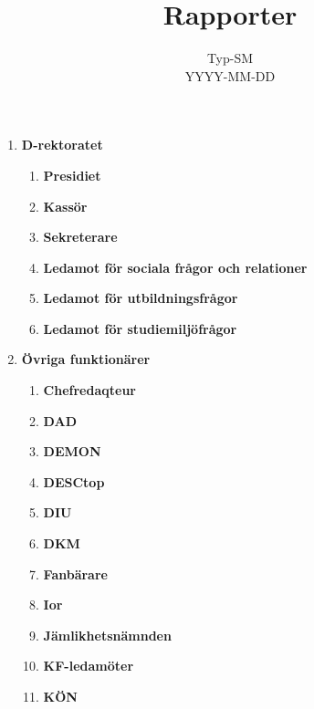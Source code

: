 \documentclass[a4paper]{article}
\title{Rapporter}
\date{Typ-SM\\YYYY-MM-DD} %
\begin{document}
\maketitle

\pagestyle{empty}
\thispagestyle{empty}

\begin{enumerate}
\item \textbf{D-rektoratet}
  \begin{enumerate}
    \item \textbf{Presidiet}

    \item \textbf{Kassör}

    \item \textbf{Sekreterare}

    \item \textbf{Ledamot för sociala frågor och relationer}

    \item \textbf{Ledamot för utbildningsfrågor}

    \item \textbf{Ledamot för studiemiljöfrågor}

  \end{enumerate}

\item \textbf{Övriga funktionärer}

  \begin{enumerate}
	\item \textbf{Chefredaqteur}  
  
	\item \textbf{DAD}

    \item \textbf{DEMON}
    
    \item \textbf{DESCtop}

    \item \textbf{DIU}

    \item \textbf{DKM}

    \item \textbf{Fanbärare}

    \item \textbf{Ior}

    \item \textbf{Jämlikhetsnämnden}

    \item \textbf{KF-ledamöter}

    \item \textbf{KÖN}


\end{enumerate}
\end{enumerate}
\end{document}
